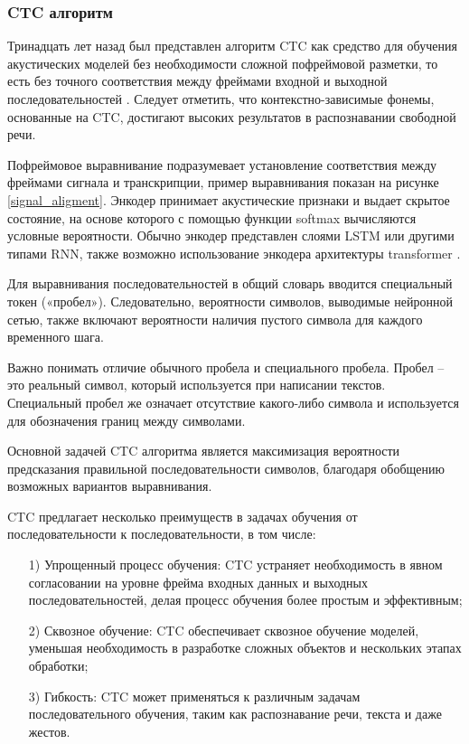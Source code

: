 \subsubsection{CTC алгоритм}

Тринадцать лет назад был представлен алгоритм CTC как средство для обучения акустических моделей без необходимости сложной пофреймовой разметки, то есть без точного соответствия между фреймами входной и выходной последовательностей \cite{bib:CTC:1}. Следует отметить, что контекстно-зависимые фонемы, основанные на CTC, достигают высоких результатов в распознавании свободной речи.

Пофреймовое выравнивание подразумевает установление соответствия между фреймами сигнала и транскрипции, пример выравнивания показан на рисунке \ref{signal_aligment}. Энкодер принимает акустические признаки и выдает скрытое состояние, на основе которого с помощью функции softmax вычисляются условные вероятности. Обычно энкодер представлен слоями LSTM или другими типами RNN, также возможно использование энкодера архитектуры transformer \cite{bib:CTC:2}.


Для выравнивания последовательностей в общий словарь вводится специальный токен («пробел»). Следовательно, вероятности символов, выводимые нейронной сетью, также включают вероятности наличия пустого символа для каждого временного шага.

Важно понимать отличие обычного пробела и специального пробела. Пробел – это реальный символ, который используется при написании текстов. Специальный пробел же означает отсутствие какого-либо символа и используется для обозначения границ между символами.

Основной задачей CTC алгоритма является максимизация вероятности предсказания правильной последовательности символов, благодаря обобщению возможных вариантов выравнивания.

CTC предлагает несколько преимуществ в задачах обучения от последовательности к последовательности, в том числе:

\vspace{0.5em-\topsep}
\begin{itemize}
    \item[1)] Упрощенный процесс обучения: CTC устраняет необходимость в явном согласовании на уровне фрейма входных данных и выходных последовательностей, делая процесс обучения более простым и эффективным;
    \item[2)] Сквозное обучение: CTC обеспечивает сквозное обучение моделей, уменьшая необходимость в разработке сложных объектов и нескольких этапах обработки;
    \item[3)] Гибкость: CTC может применяться к различным задачам последовательного обучения, таким как распознавание речи, текста и даже жестов.
\end{itemize}

